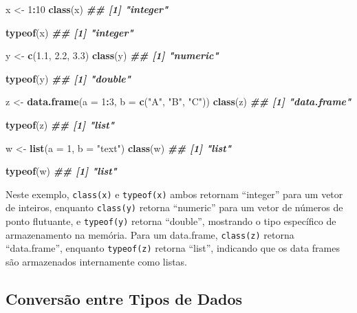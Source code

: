 \documentclass[
]{book}
\newenvironment{Shaded}{\begin{snugshade}}{\end{snugshade}}
\newcommand{\AttributeTok}[1]{\textcolor[rgb]{0.13,0.29,0.53}{#1}}
\newcommand{\DecValTok}[1]{\textcolor[rgb]{0.00,0.00,0.81}{#1}}
\newcommand{\DocumentationTok}[1]{\textcolor[rgb]{0.56,0.35,0.01}{\textbf{\textit{#1}}}}
\newcommand{\FloatTok}[1]{\textcolor[rgb]{0.00,0.00,0.81}{#1}}
\newcommand{\FunctionTok}[1]{\textcolor[rgb]{0.13,0.29,0.53}{\textbf{#1}}}
\newcommand{\NormalTok}[1]{#1}
\newcommand{\OtherTok}[1]{\textcolor[rgb]{0.56,0.35,0.01}{#1}}
\newcommand{\SpecialCharTok}[1]{\textcolor[rgb]{0.81,0.36,0.00}{\textbf{#1}}}
\newcommand{\StringTok}[1]{\textcolor[rgb]{0.31,0.60,0.02}{#1}}
\begin{document}
\begin{Shaded}
\begin{Highlighting}[]
\NormalTok{x }\OtherTok{\textless{}{-}} \DecValTok{1}\SpecialCharTok{:}\DecValTok{10}
\FunctionTok{class}\NormalTok{(x)}
\DocumentationTok{\#\# [1] "integer"}

\FunctionTok{typeof}\NormalTok{(x) }
\DocumentationTok{\#\# [1] "integer"}

\NormalTok{y }\OtherTok{\textless{}{-}} \FunctionTok{c}\NormalTok{(}\FloatTok{1.1}\NormalTok{, }\FloatTok{2.2}\NormalTok{, }\FloatTok{3.3}\NormalTok{)}
\FunctionTok{class}\NormalTok{(y) }
\DocumentationTok{\#\# [1] "numeric"}

\FunctionTok{typeof}\NormalTok{(y) }
\DocumentationTok{\#\# [1] "double"}

\NormalTok{z }\OtherTok{\textless{}{-}} \FunctionTok{data.frame}\NormalTok{(}\AttributeTok{a =} \DecValTok{1}\SpecialCharTok{:}\DecValTok{3}\NormalTok{, }\AttributeTok{b =} \FunctionTok{c}\NormalTok{(}\StringTok{"A"}\NormalTok{, }\StringTok{"B"}\NormalTok{, }\StringTok{"C"}\NormalTok{))}
\FunctionTok{class}\NormalTok{(z)}
\DocumentationTok{\#\# [1] "data.frame"}

\FunctionTok{typeof}\NormalTok{(z) }
\DocumentationTok{\#\# [1] "list"}

\NormalTok{w }\OtherTok{\textless{}{-}} \FunctionTok{list}\NormalTok{(}\AttributeTok{a =} \DecValTok{1}\NormalTok{, }\AttributeTok{b =} \StringTok{"text"}\NormalTok{)}
\FunctionTok{class}\NormalTok{(w) }
\DocumentationTok{\#\# [1] "list"}

\FunctionTok{typeof}\NormalTok{(w) }
\DocumentationTok{\#\# [1] "list"}
\end{Highlighting}
\end{Shaded}

Neste exemplo, \texttt{class(x)} e \texttt{typeof(x)} ambos retornam ``integer'' para um
vetor de inteiros, enquanto \texttt{class(y)} retorna ``numeric'' para um vetor
de números de ponto flutuante, e \texttt{typeof(y)} retorna ``double'', mostrando
o tipo específico de armazenamento na memória. Para um data.frame,
\texttt{class(z)} retorna ``data.frame'', enquanto \texttt{typeof(z)} retorna ``list'',
indicando que os data frames são armazenados internamente como listas.

\subsection{Conversão entre Tipos de Dados}\label{conversuxe3o-entre-tipos-de-dados}
\end{document}

